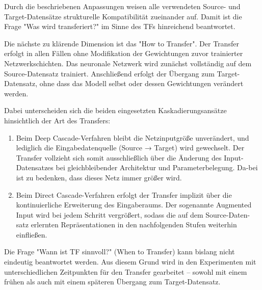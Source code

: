 Durch die beschriebenen Anpassungen weisen alle verwendeten Source- und Target-Datensätze strukturelle Kompatibilität zueinander auf. Damit ist 
die Frage "Was wird transferiert?" im Sinne des TFs hinreichend beantwortet.

Die nächste zu klärende Dimension ist das "How to Transfer". Der Transfer erfolgt in allen Fällen ohne Modifikation der Gewichtungen zuvor 
trainierter Netzwerkschichten. Das neuronale Netzwerk wird zunächst vollständig auf dem Source-Datensatz trainiert. Anschließend erfolgt der 
Übergang zum Target-Datensatz, ohne dass das Modell selbst oder dessen Gewichtungen verändert werden.

Dabei unterscheiden sich die beiden eingesetzten Kaskadierungsansätze hinsichtlich der Art des Transfers:
\begin{enumerate}
    \item Beim Deep Cascade-Verfahren bleibt die Netzinputgröße unverändert, und lediglich die Eingabedatenquelle (Source → Target) wird gewechselt. 
    Der Transfer vollzieht sich somit ausschließlich über die Änderung des Input-Datensatzes bei gleichbleibender Architektur und 
    Parameterbelegung. Da-bei ist zu bedenken, dass dieses Netz immer größer wird.
    \item Beim Direct Cascade-Verfahren erfolgt der Transfer implizit über die kontinuierliche Erweiterung des Eingaberaums. Der sogenannte 
    Augmented Input wird bei jedem Schritt vergrößert, sodass die auf dem Source-Daten-satz erlernten Repräsentationen in den nachfolgenden 
    Stufen weiterhin einfließen.
\end{enumerate}
    
    
Die Frage "Wann ist TF sinnvoll?" (When to Transfer) kann bislang nicht eindeutig beantwortet werden. Aus diesem Grund wird in 
den Experimenten mit unterschiedlichen Zeitpunkten für den Transfer gearbeitet – sowohl mit einem frühen als auch mit einem späteren Übergang 
zum Target-Datensatz.
